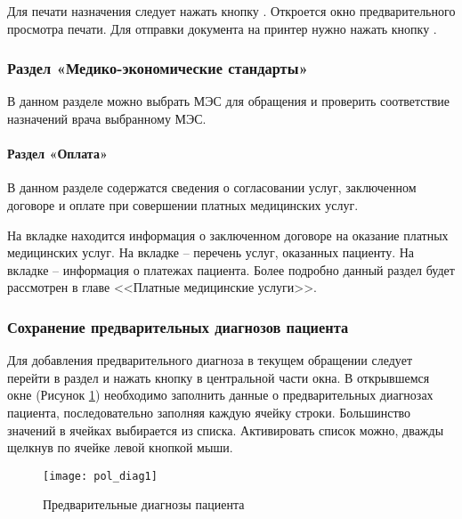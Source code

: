 Для печати назначения следует нажать кнопку . Откроется окно предварительного просмотра печати. Для отправки документа на принтер нужно нажать кнопку .

\subsubsection{Раздел «Медико-экономические стандарты»}

В данном разделе можно выбрать МЭС для обращения и проверить соответствие назначений врача выбранному МЭС.

\paragraph{Раздел «Оплата»}

В данном разделе содержатся сведения о согласовании услуг, заключенном договоре и оплате при совершении платных медицинских услуг.

На вкладке  находится информация о заключенном договоре на оказание платных медицинских услуг. На вкладке  – перечень услуг, оказанных пациенту. На вкладке  – информация о платежах пациента.
Более подробно данный раздел будет рассмотрен в главе <<Платные медицинские услуги>>.

\subsubsection{Сохранение предварительных диагнозов пациента} \label{pol_diag2}

Для добавления предварительного диагноза в текущем обращении следует перейти в раздел  и нажать кнопку  в центральной части окна. В открывшемся окне (Рисунок \ref{img_pol_diag1}) необходимо заполнить данные о предварительных диагнозах пациента, последовательно заполняя каждую ячейку строки. Большинство значений в ячейках выбирается из списка. Активировать список можно, дважды щелкнув по ячейке левой кнопкой мыши.

 \begin{figure}[ht]\centering
   \texttt{[image: pol\_diag1]}
   \caption{Предварительные диагнозы пациента}
   \label{img_pol_diag1}
 \end{figure}
 

